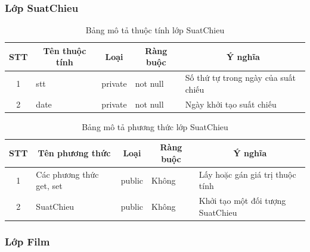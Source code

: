 \documentclass[a4paper, 12pt]{article}
\begin{document}
\subsubsection{Lớp SuatChieu}
\begin{table}[H]
	\begin{center}
		\begin{tabular}{|c|l|c|l|l|}
			\hline
			STT & \multicolumn{1}{c|}{Tên thuộc tính} & Loại                         & \multicolumn{1}{c|}{Ràng buộc} & \multicolumn{1}{c|}{Ý nghĩa}        \\ \hline
			1   & stt                                 & private                      & not null                       & Số thứ tự trong ngày của suất chiếu \\ \hline
			2   & date                                & \multicolumn{1}{l|}{private} & not null                       & Ngày khởi tạo suất chiếu            \\ \hline
		\end{tabular}
		\caption{Bảng mô tả thuộc tính lớp SuatChieu}
	\end{center}
\end{table}

\begin{table}[H]
	\begin{center}
		\begin{tabular}{|c|l|c|l|l|}
			\hline
			STT & \multicolumn{1}{c|}{Tên phương thức} & Loại                        & \multicolumn{1}{c|}{Ràng buộc} & \multicolumn{1}{c|}{Ý nghĩa}     \\ \hline
			1   & Các phương thức get, set             & public                      &                 Không               & Lấy hoặc gán giá trị thuộc tính  \\ \hline
			2   & SuatChieu                            & \multicolumn{1}{l|}{public} &                      Không          & Khởi tạo một đối tượng SuatChieu \\ \hline
			\end{tabular}
		\caption{Bảng mô tả phương thức lớp SuatChieu}
	\end{center}
\end{table}

\subsubsection{Lớp Film}
\end{document}
